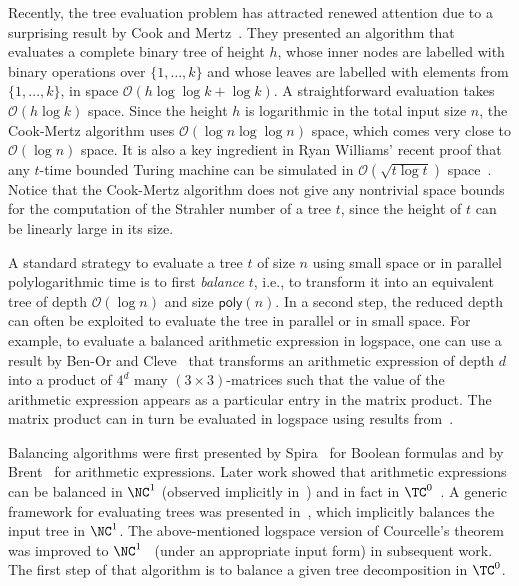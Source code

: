 \documentclass[a4paper,UKenglish,cleveref, autoref, thm-restate, numberwithinsect]{lipics-v2021}
\begin{document}
Recently, the tree evaluation problem has attracted renewed attention due to a surprising result by Cook and Mertz~\cite{CookM24}.
They presented an algorithm that evaluates a complete binary tree of height $h$, whose inner nodes are labelled with 
binary operations over $\{1, \ldots, k\}$ and whose leaves are labelled with elements from $\{1, \ldots, k\}$,
in space $\mathcal{O}(h \log \log k + \log k)$.
A straightforward evaluation takes $\mathcal{O}(h \log k)$ space.
Since the height $h$ is logarithmic in the total input size $n$, the Cook-Mertz algorithm uses $\mathcal{O}(\log n \log \log n)$ space, which comes very close to $\mathcal{O}(\log n)$ space.
It is also a key ingredient in Ryan Williams' recent proof that
any $t$-time bounded Turing machine can be simulated in $\mathcal{O}(\sqrt{t \log t})$ space~\cite{Williams25}.
Notice that the Cook-Mertz algorithm does not give any nontrivial space bounds for the computation of the Strahler number
of a tree $t$, since the height of $t$ can be linearly large in its size.

A standard strategy to evaluate a tree $t$ of size $n$ using small space or in parallel polylogarithmic time is to first \emph{balance} $t$,
i.e., to transform it into an equivalent tree of  depth $\mathcal{O}(\log n)$ and size $\mathsf{poly}(n)$.
In a second step, the reduced depth can often be exploited to evaluate the tree in parallel or in small space.
For example, to evaluate a balanced arithmetic expression in logspace, one can use a result by Ben-Or and Cleve~\cite{Ben-OrC92} that transforms
an arithmetic expression of depth $d$ into a product of $4^d$ many
$(3 \times 3)$-matrices such that the value of the arithmetic expression appears as a 
 particular entry in the matrix product.
The matrix product can in turn be evaluated in logspace using results from~\cite{ChiuDL01}.

Balancing algorithms were first presented by Spira~\cite{Spira71} for Boolean formulas and by Brent~\cite{Brent74} for arithmetic expressions.
Later work showed that arithmetic expressions can be balanced in $\NC^1$ (observed implicitly in~\cite{BCGR92}) and in fact in $\TC^0$~\cite{GanardiL19}.
A generic framework for evaluating trees was presented in~\cite{KrebsLL17}, which implicitly balances the input tree in $\NC^1$.
The above-mentioned logspace version of Courcelle's theorem was improved to $\NC^1$~\cite{ElberfeldJT12} (under an appropriate input form) in subsequent work.
The first step of that algorithm is to balance a given tree decomposition in $\TC^0$.
\end{document}
